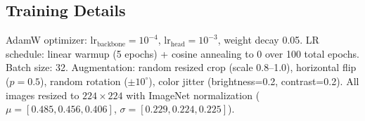 \subsection{Training Details}

AdamW optimizer: $\text{lr}_{\text{backbone}} = 10^{-4}$, $\text{lr}_{\text{head}} = 10^{-3}$, weight decay 0.05. LR schedule: linear warmup (5 epochs) + cosine annealing to 0 over 100 total epochs. Batch size: 32. Augmentation: random resized crop (scale 0.8--1.0), horizontal flip ($p=0.5$), random rotation ($\pm 10^\circ$), color jitter (brightness=0.2, contrast=0.2). All images resized to $224 \times 224$ with ImageNet normalization ($\mu=[0.485,0.456,0.406]$, $\sigma=[0.229,0.224,0.225]$).
